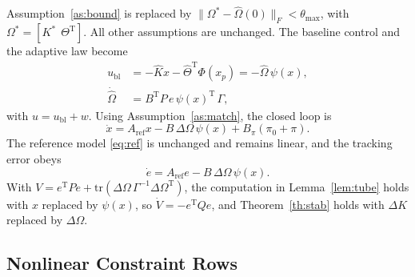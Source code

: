 \documentclass[lettersize,journal]{IEEEtran}
\newcommand{\Kh}{\hat{K}}
\newcommand{\Ar}{A_{\mathrm{ref}}}
\newcommand{\ub}{u_{\mathrm{bl}}}
\newcommand{\tmax}{\theta_{\max}}
\newcommand{\T}{\mathrm{T}}
\begin{document}
Assumption~\ref{as:bound} is replaced by $\|\Omega^*-\hat\Omega(0)\|_F<\tmax$, with $\Omega^*=[K^*\ \ \Theta^\T]$. All other assumptions are unchanged. The baseline control and the adaptive law become
\begin{align}
\ub &= -\Kh x - \hat\Theta^\T\Phi(x_p) = -\hat\Omega\,\psi(x), \label{eq:nlubl}\\
\dot{\hat\Omega} &= B^\T P\,e\,\psi(x)^\T\,\Gamma, \label{eq:nladapt}
\end{align}
with $u=\ub+w$. Using Assumption~\ref{as:match}, the closed loop is
\begin{equation}
\dot x = \Ar x - B\,\Delta\Omega\,\psi(x) + B_\pi(\pi_0+\pi). \label{eq:nlcl}
\end{equation}
The reference model \eqref{eq:ref} is unchanged and remains linear, and the tracking error obeys
\begin{equation}
\dot e = \Ar e - B\,\Delta\Omega\,\psi(x). \label{eq:nlerr}
\end{equation}
With $V=e^\T Pe+\mathrm{tr}(\Delta\Omega\,\Gamma^{-1}\Delta\Omega^\T)$, the computation in Lemma~\ref{lem:tube} holds with $x$ replaced by $\psi(x)$, so $\dot V=-e^\T Qe$, and Theorem~\ref{th:stab} holds with $\Delta K$ replaced by $\Delta\Omega$.

\subsection{Nonlinear Constraint Rows}
\end{document}
